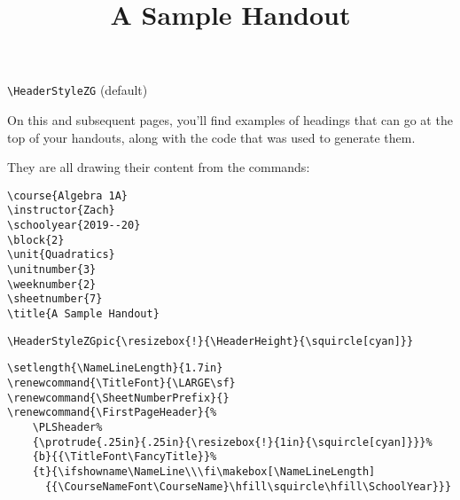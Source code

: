\documentclass[12pt,twoside,parskip,notitle]{handout}
\title{A Sample Handout}
\begin{document}
\begingroup
\HeaderStyleZG
\maketitle
\verb|\HeaderStyleZG| (default)
\endgroup

\vfill
On this and subsequent pages, you'll find examples of headings that can go at the top of your handouts, along with the code that was used to generate them.

They are all drawing their content from the commands:
\begingroup
\singlespacing
\begin{verbatim}
\course{Algebra 1A}
\instructor{Zach}
\schoolyear{2019--20}
\block{2}
\unit{Quadratics}
\unitnumber{3}
\weeknumber{2}
\sheetnumber{7}
\title{A Sample Handout}
\end{verbatim}
\endgroup

\newpage

\begingroup
\HeaderStyleZGpic{\resizebox{!}{\HeaderHeight}{\squircle[cyan]}}
\maketitle
\verb|\HeaderStyleZGpic{\resizebox{!}{\HeaderHeight}{\squircle[cyan]}}|
\endgroup

\newpage

\begingroup
\setlength{\NameLineLength}{1.7in}
\renewcommand{\TitleFont}{\LARGE\sf}
\renewcommand{\SheetNumberPrefix}{}
\renewcommand{\FirstPageHeader}{%
	\PLSheader%
	{\protrude{.25in}{.25in}{\resizebox{!}{1in}{\squircle[cyan]}}}%
	{b}{{\TitleFont\FancyTitle}}%
	{t}{\ifshowname\NameLine\\\fi\makebox[\NameLineLength]{{\CourseNameFont\CourseName}\hfill\squircle\hfill\SchoolYear}}}%
\maketitle
\singlespacing
\begin{verbatim}
\setlength{\NameLineLength}{1.7in}
\renewcommand{\TitleFont}{\LARGE\sf}
\renewcommand{\SheetNumberPrefix}{}
\renewcommand{\FirstPageHeader}{%
    \PLSheader%
    {\protrude{.25in}{.25in}{\resizebox{!}{1in}{\squircle[cyan]}}}%
    {b}{{\TitleFont\FancyTitle}}%
    {t}{\ifshowname\NameLine\\\fi\makebox[\NameLineLength]
      {{\CourseNameFont\CourseName}\hfill\squircle\hfill\SchoolYear}}}
\end{verbatim}
\endgroup

\newpage
\end{document}
